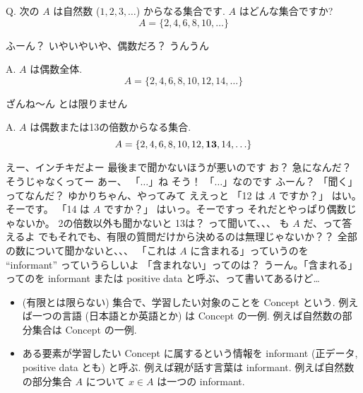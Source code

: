 \begin{boxnote}
    {\rm Q.} 次の $A$ は自然数 ($1, 2, 3, \ldots$) からなる集合です.  $A$ はどんな集合ですか?
$$A = \{2, 4, 6, 8, 10, \ldots\}$$
\end{boxnote}

\YUI ふーん？
\YUI いやいやいや、偶数だろ？
\YUKARI うんうん

\begin{boxnote}
    {\rm A.} $A$ は偶数全体.
    $$A = \{2, 4, 6, 8, 10, 12, 14, \ldots\}$$
\end{boxnote}

\YUZUKO ざんね〜ん
\YUZUKO とは限りません

\begin{boxnote}
    {\rm A.} $A$ は偶数または13の倍数からなる集合.
    $$A = \{2, 4, 6, 8, 10, 12, {\bf 13}, 14, \ldots\}$$
\end{boxnote}

\YUKARI えー、インチキだよー
\YUZUKO 最後まで聞かないほうが悪いのです
\YUI お？ 急になんだ？
\YUZUKO そうじゃなくってー
\YUKARI あー、 「$\dots$」ね
\YUZUKO そう！ 「$\dots$」なのです
\YUI ふーん？ 「聞く」ってなんだ？
\YUZUKO ゆかりちゃん、やってみて
\YUKARI ええっと
\YUKARI 「12 は $A$ ですか？」
\YUZUKO はい。そーです。
\YUKARI 「14 は $A$ ですか？」
\YUZUKO はいっ。そーですっ
\YUI それだとやっぱり偶数じゃないか。 2の倍数以外も聞かないと
\YUI 13は？ って聞いて、、、
 も $A$ だ、って答えるよ
\YUI でもそれでも、有限の質問だけから決めるのは無理じゃないか？？
\YUI 全部の数について聞かないと、、、
\YUZUKO 「これは $A$ に含まれる」っていうのを ``informant'' っていうらしいよ
\YUKARI 「含まれない」ってのは？
\YUZUKO うーん。「含まれる」ってのを informant または positive data と呼ぶ、って書いてあるけど…

\begin{boxnote}
    \begin{itemize}
        \item
            (有限とは限らない) 集合で、学習したい対象のことを Concept という.
            例えば一つの言語 (日本語とか英語とか) は Concept の一例.
            例えば自然数の部分集合は Concept の一例.
        \item
            ある要素が学習したい Concept に属するという情報を informant (正データ, positive data とも) と呼ぶ.
            例えば親が話す言葉は informant.
            例えば自然数の部分集合 $A$ について $x \in A$ は一つの informant.
    \end{itemize}
\end{boxnote}

